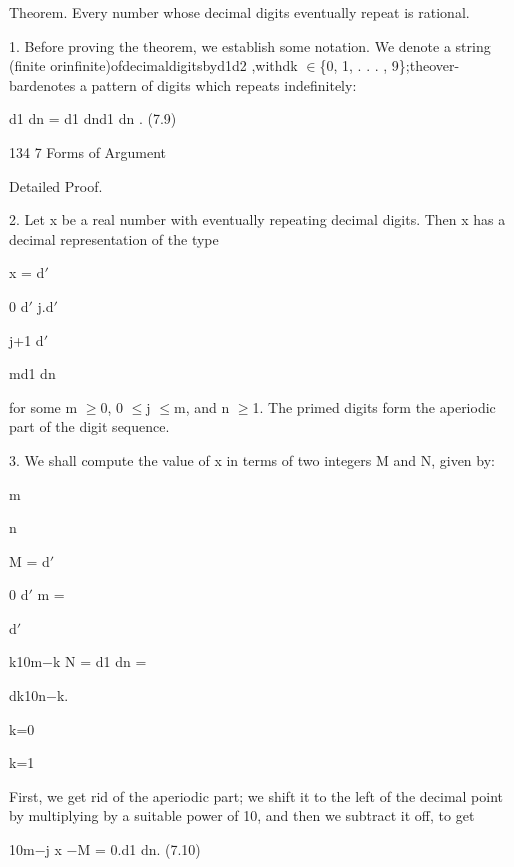 \documentclass[11pt]{article}
\theoremstyle{plain}
\theoremstyle{definition}
\begin{document}
Theorem. Every number whose decimal digits eventually repeat is rational.

1. Before proving the theorem, we establish some notation. We denote a string (finite orinfinite)ofdecimaldigitsbyd1d2 \textperiodcentered{} \textperiodcentered{} \textperiodcentered{} ,withdk $\in$\{0, 1, . . . , 9\};theover-bardenotes a pattern of digits which repeats indefinitely:

d1 \textperiodcentered{} \textperiodcentered{} \textperiodcentered{} dn = d1 \textperiodcentered{} \textperiodcentered{} \textperiodcentered{} dnd1 \textperiodcentered{} \textperiodcentered{} \textperiodcentered{} dn \textperiodcentered{} \textperiodcentered{} \textperiodcentered{} . (7.9)

134 7 Forms of Argument

Detailed Proof.

2. Let x be a real number with eventually repeating decimal digits. Then x has a decimal representation of the type

x = d$'$

0 \textperiodcentered{} \textperiodcentered{} \textperiodcentered{} d$'$ j.d$'$

j+1 \textperiodcentered{} \textperiodcentered{} \textperiodcentered{} d$'$

md1 \textperiodcentered{} \textperiodcentered{} \textperiodcentered{} dn

for some m $\geq$0, 0 $\leq$j $\leq$m, and n $\geq$1. The primed digits form the aperiodic part of the digit sequence.

3. We shall compute the value of x in terms of two integers M and N, given by:

m

n

M = d$'$

0 \textperiodcentered{} \textperiodcentered{} \textperiodcentered{} d$'$ m =

d$'$

k10m$-$k N = d1 \textperiodcentered{} \textperiodcentered{} \textperiodcentered{} dn =

dk10n$-$k.

k=0

k=1

First, we get rid of the aperiodic part; we shift it to the left of the decimal point by multiplying by a suitable power of 10, and then we subtract it off, to get

10m$-$j x $-$M = 0.d1 \textperiodcentered{} \textperiodcentered{} \textperiodcentered{} dn. (7.10)
\end{document}
